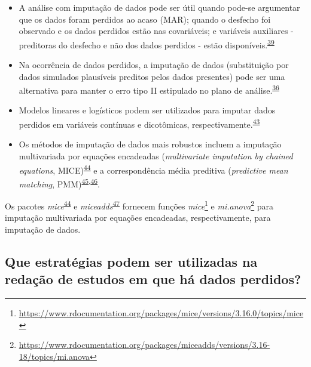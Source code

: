 \documentclass[
  a4paper,
]{book}
\renewcommand{\href}[2]{#2\footnote{\url{#1}}}
\newenvironment{infobox}[1]
  {
  \begin{itemize}
  \renewcommand{\labelitemi}{
    \raisebox{-.7\height}[0pt][0pt]{
      {\setkeys{Gin}{width=3em,keepaspectratio}
        \texttt{[image: \#1]}}
    }
  }
  \setlength{\fboxsep}{1em}
  \begin{blackbox}
  \item
  }
  {
  \end{blackbox}
  \end{itemize}
  }
\begin{document}
\begin{itemize}
\item
  A análise com imputação de dados pode ser útil quando pode-se argumentar que os dados foram perdidos ao acaso (MAR); quando o desfecho foi observado e os dados perdidos estão nas covariáveis; e variáveis auxiliares - preditoras do desfecho e não dos dados perdidos - estão disponíveis.\textsuperscript{\protect\hyperlink{ref-carpenter2021}{39}}
\item
  Na ocorrência de dados perdidos, a imputação de dados (substituição por dados simulados plausíveis preditos pelos dados presentes) pode ser uma alternativa para manter o erro tipo II estipulado no plano de análise.\textsuperscript{\protect\hyperlink{ref-Altman2007}{36}}
\item
  Modelos lineares e logísticos podem ser utilizados para imputar dados perdidos em variáveis contínuas e dicotômicas, respectivamente.\textsuperscript{\protect\hyperlink{ref-austin2023}{43}}
\item
  Os métodos de imputação de dados mais robustos incluem a imputação multivariada por equações encadeadas (\emph{multivariate imputation by chained equations}, MICE)\textsuperscript{\protect\hyperlink{ref-mice}{44}} e a correspondência média preditiva (\emph{predictive mean matching}, PMM)\textsuperscript{\protect\hyperlink{ref-rubin1986}{45},\protect\hyperlink{ref-little1988a}{46}}.
\end{itemize}

\begin{infobox}{images/Rlogo}
Os pacotes \emph{mice}\textsuperscript{\protect\hyperlink{ref-mice}{44}} e \emph{miceadds}\textsuperscript{\protect\hyperlink{ref-miceadds}{47}} fornecem funções \href{https://www.rdocumentation.org/packages/mice/versions/3.16.0/topics/mice}{\emph{mice}} e \href{https://www.rdocumentation.org/packages/miceadds/versions/3.16-18/topics/mi.anova}{\emph{mi.anova}} para imputação multivariada por equações encadeadas, respectivamente, para imputação de dados.

\end{infobox}

\hypertarget{que-estratuxe9gias-podem-ser-utilizadas-na-redauxe7uxe3o-de-estudos-em-que-huxe1-dados-perdidos}{%
\subsection{Que estratégias podem ser utilizadas na redação de estudos em que há dados perdidos?}\label{que-estratuxe9gias-podem-ser-utilizadas-na-redauxe7uxe3o-de-estudos-em-que-huxe1-dados-perdidos}}
\end{document}
